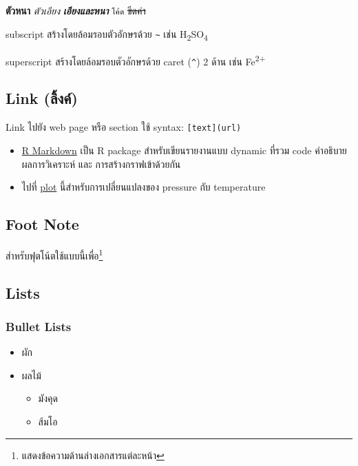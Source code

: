 \documentclass[
]{article}
\providecommand{\tightlist}{%
  \setlength{\itemsep}{0pt}\setlength{\parskip}{0pt}}
\begin{document}
\textbf{ตัวหนา} \emph{ตัวเอียง} \textbf{\emph{เอียงและหนา}}
\texttt{โค้ด} \sout{ขีดค่า}

subscript สร้างโดยล้อมรอบตัวอักษรด้วย \texttt{\textasciitilde{}} เช่น
H\textsubscript{2}SO\textsubscript{4}

superscript สร้างโดยล้อมรอบตัวอักษรด้วย caret (\texttt{\^{}}) 2 ด้าน
เช่น Fe\textsuperscript{2+}

\hypertarget{link-uxe25uxe07uxe04}{%
\subsection{Link (ลิ้งค์)}\label{link-uxe25uxe07uxe04}}

Link ไปยัง web page หรือ section ใช้ syntax: \texttt{{[}text{]}(url)}

\begin{itemize}
\item
  \href{https://rmarkdown.rstudio.com}{R Markdown} เป็น R package
  สำหรับเขียนรายงานแบบ dynamic ที่รวม code คำอธิบาย ผลการวิเคราะห์ และ
  การสร้างกราฟเข้าด้วยกัน
\item
  ไปที่ \protect\hyperlink{plot}{plot} นี้สำหรับการเปลี่ยนแปลงของ
  pressure กับ temperature
\end{itemize}

\hypertarget{foot-note}{%
\subsection{Foot Note}\label{foot-note}}

สำหรับฟุตโน้ตใช้แบบนี้เพื่อ\footnote{แสดงข้อความด้านล่างเอกสารแต่ละหน้า}

\hypertarget{lists}{%
\subsection{Lists}\label{lists}}

\hypertarget{bullet-lists}{%
\subsubsection{Bullet Lists}\label{bullet-lists}}

\begin{itemize}
\item
  ผัก
\item
  ผลไม้

  \begin{itemize}
  \tightlist
  \item
    มังคุด
  \item
    ส้มโอ
  \end{itemize}
\end{itemize}
\end{document}
